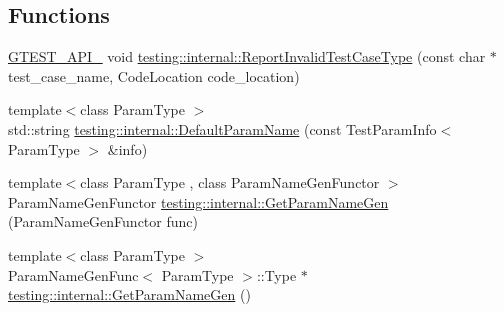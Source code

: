 \subsection*{Functions}
\begin{DoxyCompactItemize}
\item 
\mbox{\hyperlink{_obj__test_2lib_2googletest-release-1_88_81_2googletest_2include_2gtest_2internal_2gtest-port_8h_aa73be6f0ba4a7456180a94904ce17790}{G\+T\+E\+S\+T\+\_\+\+A\+P\+I\+\_\+}} void \mbox{\hyperlink{namespacetesting_1_1internal_ab7e343160ee0aca7c8ae7c025a372453}{testing\+::internal\+::\+Report\+Invalid\+Test\+Case\+Type}} (const char $\ast$test\+\_\+case\+\_\+name, Code\+Location code\+\_\+location)
\item 
{\footnotesize template$<$class Param\+Type $>$ }\\std\+::string \mbox{\hyperlink{namespacetesting_1_1internal_a954ec4a8a932dac7743e77e459ffefdc}{testing\+::internal\+::\+Default\+Param\+Name}} (const Test\+Param\+Info$<$ Param\+Type $>$ \&info)
\item 
{\footnotesize template$<$class Param\+Type , class Param\+Name\+Gen\+Functor $>$ }\\Param\+Name\+Gen\+Functor \mbox{\hyperlink{namespacetesting_1_1internal_abc0f0626877188afba6ad122d502f088}{testing\+::internal\+::\+Get\+Param\+Name\+Gen}} (Param\+Name\+Gen\+Functor func)
\item 
{\footnotesize template$<$class Param\+Type $>$ }\\Param\+Name\+Gen\+Func$<$ Param\+Type $>$\+::Type $\ast$ \mbox{\hyperlink{namespacetesting_1_1internal_a27d6ea7d401e877cb0fbddf4206ebbe4}{testing\+::internal\+::\+Get\+Param\+Name\+Gen}} ()
\end{DoxyCompactItemize}
